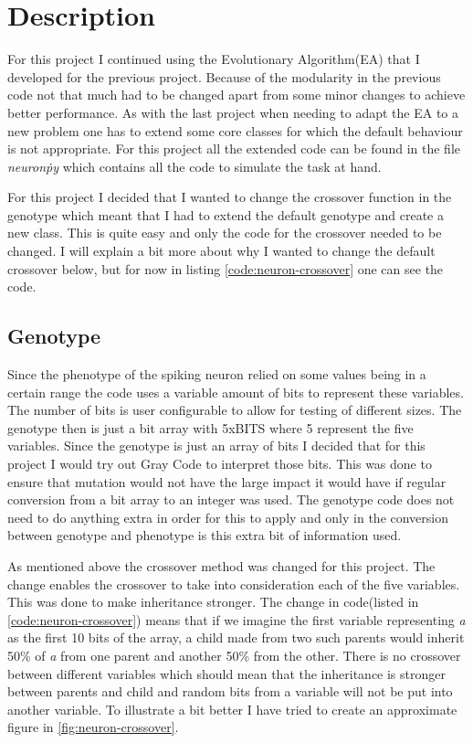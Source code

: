 \section{Description}\label{sec:description}
For this project I continued using the Evolutionary Algorithm(EA) that I
developed for the previous project. Because of the modularity in the previous
code not that much had to be changed apart from some minor changes to achieve
better performance. As with the last project when needing to adapt the EA to a
new problem one has to extend some core classes for which the default behaviour
is not appropriate. For this project all the extended code can be found in the
file \textit{neuron\.py} which contains all the code to simulate the task at
hand.

For this project I decided that I wanted to change the crossover function in the
genotype which meant that I had to extend the default genotype and create a new
class. This is quite easy and only the code for the crossover needed to be
changed. I will explain a bit more about why I wanted to change the default
crossover below, but for now in listing \ref{code:neuron-crossover} one can see
the code.



\subsection{Genotype}\label{sec:genotype-description}
Since the phenotype of the spiking neuron relied on some values being in a
certain range the code uses a variable amount of bits to represent these
variables. The number of bits is user configurable to allow for testing of
different sizes. The genotype then is just a bit array with 5xBITS where 5 represent
the five variables. Since the genotype is just an array of bits I decided that
for this project I would try out Gray Code to interpret those bits. This was
done to ensure that mutation would not have the large impact it would have if
regular conversion from a bit array to an integer was used. The genotype code
does not need to do anything extra in order for this to apply and only in the
conversion between genotype and phenotype is this extra bit of information used.

As mentioned above the crossover method was changed for this project. The change
enables the crossover to take into consideration each of the five variables.
This was done to make inheritance stronger. The change in code(listed in
\ref{code:neuron-crossover}) means that if we imagine the first variable
representing \textit{a} as the first 10 bits of the array, a child made from two
such parents would inherit 50\% of \textit{a} from one parent and another 50\%
from the other. There is no crossover between different variables which should
mean that the inheritance is stronger between parents and child and random bits
from a variable will not be put into another variable. To illustrate a bit
better I have tried to create an approximate figure in
\ref{fig:neuron-crossover}.

